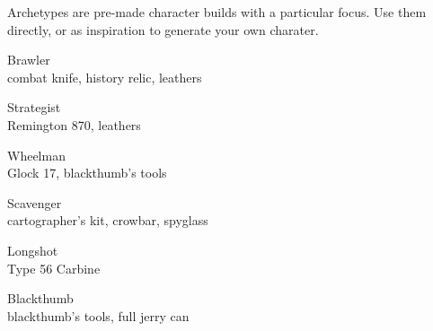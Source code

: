 
Archetypes are pre-made character builds with a particular focus. Use them directly, or as inspiration to generate your own charater.

\vspace*{-1em}
\begin{flushleft}

\begin{multicols}{2}
\begin{describe}{Brawler} \\
   
combat knife, history relic, leathers
\end{describe}

\begin{describe}{Strategist} \\
   
Remington 870, leathers
\end{describe}
\end{multicols}

\vspace*{-1.5em}

\begin{multicols}{2}
\begin{describe}{Wheelman} \\
   
Glock 17, blackthumb's tools
\end{describe}

\begin{describe}{Scavenger} \\
   
cartographer's kit, crowbar, spyglass
\end{describe}
\end{multicols}

\vspace*{-1.5em}

\begin{multicols}{2}
\begin{describe}{Longshot} \\
   
Type 56 Carbine
\end{describe}

\begin{describe}{Blackthumb} \\
   
blackthumb's tools, full jerry can
\end{describe}
\end{multicols}

\end{flushleft}
\vspace*{-2em}
